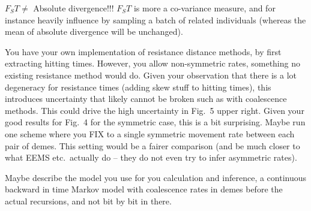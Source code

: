 
\begin{point}{\revref}
    $F_ST \neq$ Absolute divergence!!!  $F_ST$ is more a
    co-variance measure, and for instance heavily influence by sampling a batch
    of related individuals (whereas the mean of absolute divergence will be
    unchanged).
\end{point}


\begin{point}{}
    You have your own implementation of resistance distance methods, by first
    extracting hitting times. However, you allow non-symmetric rates, something
    no existing resistance method would do. Given your observation that there
    is a lot degeneracy for resistance times (adding skew stuff to hitting
    times), this introduces uncertainty that likely cannot be broken such as
    with coalescence methods. This could drive the high uncertainty in Fig.\ 5
    upper right. Given your good results for Fig.\ 4 for the symmetric case,
    this is a bit surprising. Maybe run one scheme where you FIX to a single
    symmetric movement rate between each pair of demes. This setting would be a
    fairer comparison (and be much closer to what EEMS etc.\ actually do -- they
    do not even try to infer asymmetric rates).
\end{point}



\begin{point}{}
    Maybe describe the model you use for you calculation and inference, a
    continuous backward in time Markov model with coalescence rates in demes
    before the actual recursions, and not bit by bit in there.
\end{point}

